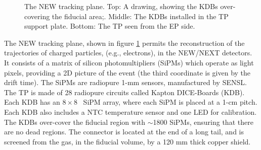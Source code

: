 \begin{figure}[hpt!]
\caption{The NEW tracking plane. Top: A drawing, showing the KDBs over-covering the fiducial area;.
Middle: The KDBs installed in the TP support plate. Bottom: The TP seen from the EP side.} \label{fig:NTP}
\end{figure}

The NEW tracking plane, shown in figure \ref{fig:NTP} permits the reconstruction of the trajectories of charged particles, (e.g., electrons), in the NEW/NEXT detectors. It consists of a matrix of silicon photomultipliers (SiPMs) which operate as light pixels, providing a 2D picture of the event (the third coordinate is given by the drift time). The SiPMs are radiopure 1-mm sensors, manufactured by SENSL. The TP is made of 28 radiopure circuits called Kapton DICE-Boards (KDB). Each KDB has an $8\times8$~ SiPM array, where each SiPM is placed at a 1-cm pitch. Each KDB also includes a NTC temperature sensor and one LED for calibration. The KDBs over-cover the fiducial region with $\sim$1800 SiPMs, ensuring that there are no dead regions. The connector is located at the end of a long tail, and is screened from the gas, in the fiducial volume, by a 120 mm thick copper shield.

%
%
%
%

